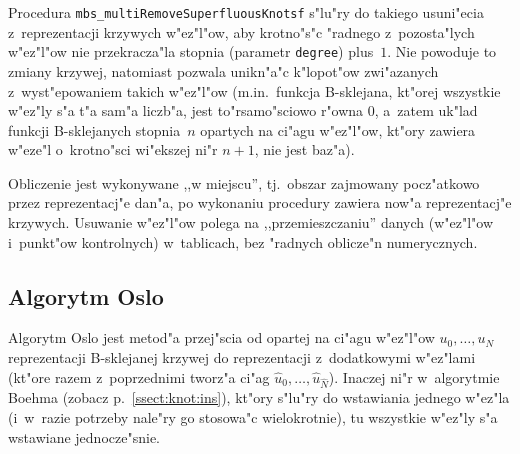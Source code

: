 \vspace{\bigskipamount}
\begin{sloppypar}
Procedura \texttt{mbs\_multiRemoveSuperfluousKnotsf} s"lu"ry do takiego
usuni"ecia z~reprezentacji krzywych w"ez"l"ow, aby krotno"s"c "radnego
z~pozosta"lych w"ez"l"ow nie przekracza"la stopnia (parametr \texttt{degree})
plus~$1$. Nie powoduje to zmiany krzywej, natomiast pozwala unikn"a"c
k"lopot"ow zwi"azanych z~wyst"epowaniem takich w"ez"l"ow (m.in.\
funkcja B-sklejana, kt"orej wszystkie w"ez"ly s"a t"a sam"a liczb"a,
jest to"r\-sa\-mo"s\-cio\-wo r"owna $0$, a~zatem uk"lad funkcji B-sklejanych
stopnia~$n$ opartych na ci"agu w"ez"l"ow, kt"ory zawiera w"eze"l
o~krotno"sci wi"ekszej ni"r $n+1$, nie jest baz"a).
\end{sloppypar}

Obliczenie jest wykonywane ,,w miejscu'', tj.\ obszar zajmowany
pocz"atkowo przez reprezentacj"e dan"a, po wykonaniu procedury zawiera now"a
reprezentacj"e krzywych. Usuwanie w"ez"l"ow polega na ,,przemieszczaniu''
danych (w"ez"l"ow i~punkt"ow kontrolnych) w~tablicach, bez
"radnych oblicze"n numerycznych.


\subsection{Algorytm Oslo}

Algorytm Oslo jest metod"a przej"scia od opartej na
ci"agu w"ez"l"ow $u_0,\ldots,u_N$ reprezentacji B-sklejanej krzywej
do reprezentacji z~dodatkowymi w"ez\-"lami (kt"ore razem z~poprzednimi
tworz"a ci"ag $\hat{u}_0,\ldots,\hat{u}_{\hat{N}}$).
Inaczej ni"r w~algorytmie Boehma (zobacz
p.~\ref{ssect:knot:ins}), kt"ory s"lu"ry do wstawiania jednego w"ez"la
(i~w~razie potrzeby nale"ry go stosowa"c wielokrotnie), tu wszystkie w"ez"ly
s"a wstawiane jednocze"snie.

